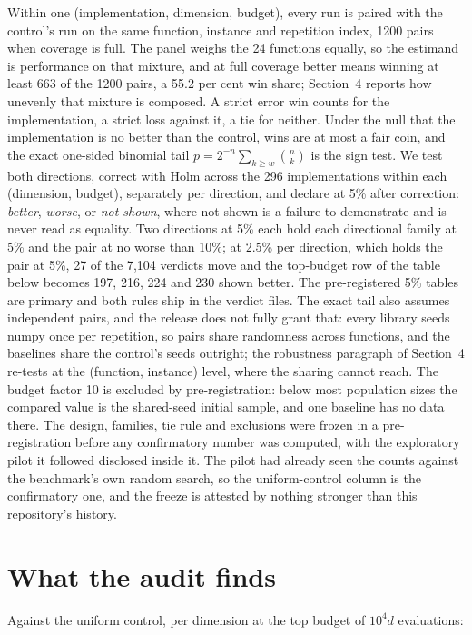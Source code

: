 \documentclass[11pt]{article}
\begin{document}
Within one (implementation, dimension, budget), every run is paired with the control's
run on the same function, instance and repetition index, 1200 pairs when coverage is
full. The panel weighs the 24 functions equally, so the estimand is performance on that
mixture, and at full coverage better means winning at least 663 of the 1200 pairs, a
55.2 per cent win share; Section~4 reports how unevenly that mixture is composed. A
strict error win counts for the implementation, a strict loss against it, a tie
for neither. Under the null that the implementation is no better than the control, wins
are at most a fair coin, and the exact one-sided binomial tail
$p = 2^{-n}\sum_{k \ge w}\binom{n}{k}$ is the sign test. We test both directions,
correct with Holm \cite{holm79} across the 296 implementations within each (dimension,
budget), separately per direction, and declare at 5\% after correction: \emph{better},
\emph{worse}, or \emph{not shown}, where not shown is a failure to demonstrate and is
never read as equality. Two directions at 5\% each hold each directional family at
5\% and the pair at no worse than 10\%; at 2.5\% per direction, which holds the pair
at 5\%, 27 of the 7{,}104 verdicts move and the top-budget row of the table below
becomes 197, 216, 224 and 230 shown better. The pre-registered 5\% tables are primary
and both rules ship in the verdict files. The exact tail also assumes independent
pairs, and the release does not fully grant that: every library seeds numpy once per
repetition, so pairs share randomness across functions, and the baselines share the
control's seeds outright; the robustness paragraph of Section~4 re-tests at the
(function, instance) level, where the sharing cannot reach. The budget factor 10 is
excluded by pre-registration: below most population sizes the compared value is the
shared-seed initial sample, and one baseline has no data there. The design, families,
tie rule and exclusions were frozen in a pre-registration before any confirmatory
number was computed, with the exploratory pilot it followed disclosed inside it. The
pilot had already seen the counts against the benchmark's own random search, so the
uniform-control column is the confirmatory one, and the freeze is attested by nothing
stronger than this repository's history.

\section{What the audit finds}

Against the uniform control, per dimension at the top budget of $10^4 d$ evaluations:
\end{document}
